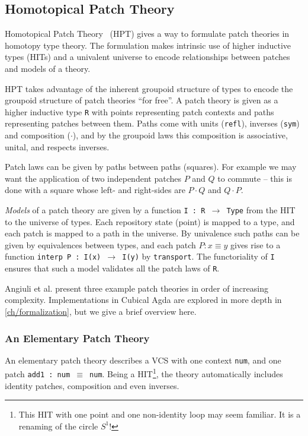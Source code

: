 \subsection{Homotopical Patch Theory}\label{subsec:hpt}

Homotopical Patch Theory~\cite{Angiuli2016} (HPT) gives a way to formulate patch
theories in homotopy type theory. The formulation makes intrinsic use of higher
inductive types (HITs) and a univalent universe to encode relationships between
patches and models of a theory.

HPT takes advantage of the inherent groupoid structure of types to encode the
groupoid structure of patch theories ``for free''. A patch theory is given as a
higher inductive type \texttt{R} with points representing patch contexts and
paths representing patches between them. Paths come with units (\texttt{refl}),
inverses (\texttt{sym}) and composition (\texttt{$\cdot$}),
and by the groupoid laws this composition is associative, unital, and respects
inverses.

Patch laws can be given by paths between paths (squares). For example we may
want the application of two independent patches $P$ and $Q$ to commute -- this is done with
a square whose left- and right-sides are $P \cdot Q$ and $Q \cdot P$.

\emph{Models} of a patch theory are given by a function \texttt{I : R
  $\rightarrow$ Type} from the HIT to the universe of types. Each repository
state (point) is mapped to a type, and each patch is mapped to a path in the
universe. By univalence such paths can be given by equivalences between types,
and each patch $P : x \equiv y$ gives rise to a function \texttt{interp P : I(x)
$\rightarrow$ I(y)} by \texttt{transport}. The functoriality of \texttt{I}
ensures that such a model validates all the patch laws of \texttt{R}.

Angiuli et al. present three example patch theories in order of increasing
complexity. Implementations in Cubical Agda are explored in more depth in
\autoref{ch/formalization}, but we give a brief overview here.

\subsubsection{An Elementary Patch Theory}

An elementary patch theory describes a VCS with one context \texttt{num}, and
one patch \texttt{add1 : num $\equiv$ num}. Being a HIT\footnote{This HIT with one point and
one non-identity loop may seem familiar. It is a renaming of the circle $S^1$!},
the theory automatically includes identity patches, composition and even inverses.

